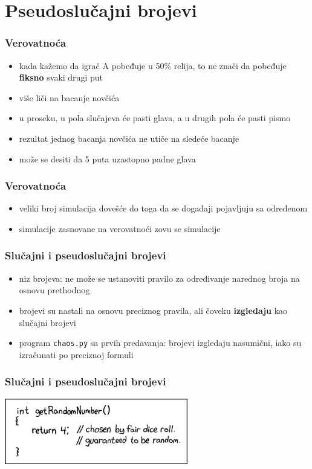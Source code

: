 \documentclass[utf8,compress,aspectratio=169]{beamer}
\begin{document}
\section[Random]{Pseudoslučajni brojevi}

\begin{frame}
  \frametitle{Verovatnoća}
  \begin{itemize}
    \item kada kažemo da igrač A pobeđuje u 50\% relija, to ne znači da pobeđuje \textbf{fiksno} svaki drugi put
    \item više liči na bacanje novčića
    \item u proseku, u pola slučajeva će pasti glava, a u drugih pola će pasti pismo
    \item rezultat jednog bacanja novčića ne utiče na sledeće bacanje
    \item može se desiti da 5 puta uzastopno padne glava
  \end{itemize}
\end{frame}

\begin{frame}
  \frametitle{Verovatnoća}
  \begin{itemize}
    \item veliki broj simulacija dovešće do toga da se događaji pojavljuju sa određenom 
    \item simulacije zasnovane na verovatnoći zovu se  simulacije
  \end{itemize}
\end{frame}

\begin{frame}
  \frametitle{Slučajni i pseudoslučajni brojevi}
  \begin{itemize}
    \item niz  brojeva: ne može se ustanoviti pravilo za određivanje narednog broja na osnovu prethodnog
    \item {} brojevi su nastali na osnovu preciznog pravila, ali čoveku \textbf{izgledaju} kao slučajni brojevi
    \item program \texttt{chaos.py} sa prvih predavanja: brojevi izgledaju nasumični, iako su izračunati po preciznoj formuli
  \end{itemize}
\end{frame}

\begin{frame}
  \frametitle{Slučajni i pseudoslučajni brojevi}
  \begin{center}
    \includegraphics[width=8cm]{pic31.png}
  \end{center}
\end{frame}
\end{document}
